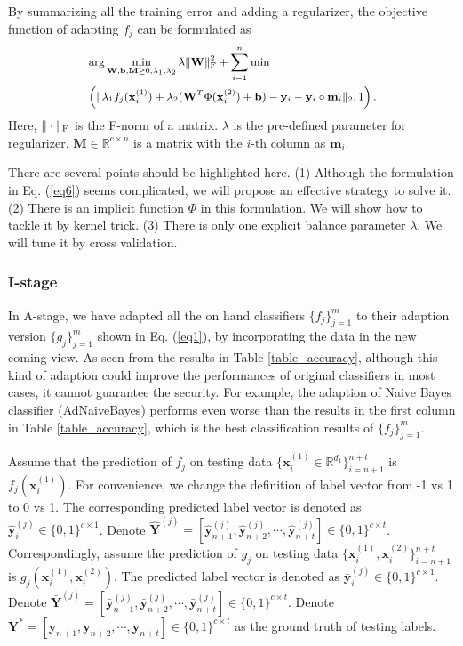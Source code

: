 \documentclass[10pt,journal,compsoc]{IEEEtran}
\begin{document}
By summarizing all the training error and adding a regularizer, the objective function of adapting $f_j$ can be formulated as
\begin{equation}
\label{eq6}
\small{
\begin{split}
& \arg \min_{\mathbf{W},\mathbf{b}, \mathbf{M} \geq 0, \lambda_1,\lambda_2} \lambda \|\mathbf{W}\|_{\rm{F}}^{2} + \sum_{i=1}^n \min \\
&\left(\| \lambda_1 f_j(\mathbf{x}_i^{(1)})+\lambda_2 (\mathbf{W}^T \Phi(\mathbf{x}_i^{(2)})+\mathbf{b}) - \mathbf{y}_i-\mathbf{y}_i \circ \mathbf{m}_i\|_2 ,1 \right).
\end{split}}
\end{equation}
Here, $\|\cdot\|_{\rm{F}}$ is the F-norm of a matrix. $\lambda$ is the pre-defined parameter for regularizer. $\mathbf{M} \in \mathbb{R}^{c\times n}$ is a matrix with the $i$-th column as $\mathbf{m}_i$.

There are several points should be highlighted here. (1) Although the formulation in Eq. (\ref{eq6}) seems complicated, we will propose an effective strategy to solve it. (2) There is an implicit function $\Phi$ in this formulation. We will show how to tackle it by kernel trick. (3) There is only one explicit balance parameter $\lambda$. We will tune it by cross validation.

\subsubsection{I-stage}

In A-stage, we have adapted all the on hand classifiers $\{ f_j\}_{j=1}^m$ to their adaption version $\{ g_j\}_{j=1}^m$ shown in Eq. (\ref{eq1}), by incorporating the data in the new coming view. As seen from the results in Table \ref{table_accuracy}, although this kind of adaption could improve the performances of original classifiers in most cases, it cannot guarantee the security. For example, the adaption of Naive Bayes classifier (AdNaiveBayes) performs even worse than the results in the first column in Table \ref{table_accuracy}, which is the best classification results of $\{ f_j\}_{j=1}^m$.

Assume that the prediction of $f_j$ on testing data $\{\mathbf{x}_i^{(1)} \in \mathbb{R}^{d_1} \}_{i=n+1}^{n+t}$ is $f_j(\mathbf{x}_i^{(1)})$. For convenience, we change the definition of label vector from -1 vs 1 to 0 vs 1. The corresponding predicted label vector is denoted as $\hat{\mathbf{y}}_i^{(j)} \in \{0,1\}^{c\times1}$. Denote $\hat{\mathbf{Y}}^{(j)} = [\hat{\mathbf{y}}_{n+1}^{(j)},\hat{\mathbf{y}}_{n+2}^{(j)}, \cdots,\hat{\mathbf{y}}_{n+t}^{(j)}] \in \{0,1\}^{c \times t}$. Correspondingly, assume the prediction of $g_j$ on testing data $\{\mathbf{x}_i^{(1)}, \mathbf{x}_i^{(2)} \}_{i=n+1}^{n+t}$ is $g_j(\mathbf{x}_i^{(1)}, \mathbf{x}_i^{(2)})$. The predicted label vector is denoted as $\bar{\mathbf{y}}_i^{(j)} \in \{0,1\}^{c\times1}$. Denote $\bar{\mathbf{Y}}^{(j)} = [\bar{\mathbf{y}}_{n+1}^{(j)},\bar{\mathbf{y}}_{n+2}^{(j)}, \cdots,\bar{\mathbf{y}}_{n+t}^{(j)}] \in \{0,1\}^{c \times t}$. Denote $\mathbf{Y}^{*} = [\mathbf{y}_{n+1},\mathbf{y}_{n+2}, \cdots,\mathbf{y}_{n+t}] \in \{0,1\}^{c \times t}$ as the ground truth of testing labels.
\end{document}
